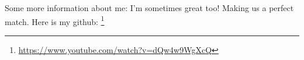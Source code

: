 Some more information about me: I'm sometimes great too! Making us a perfect match.
Here is my github: \footnote{\url{https://www.youtube.com/watch?v=dQw4w9WgXcQ}}
